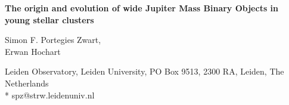 \documentclass[submission,phys]{lib/SciPost}
\begin{document}
 

\begin{center}{\Large \textbf{
      The origin and evolution of wide Jupiter Mass Binary Objects in young stellar clusters
    }}
\end{center} 

\begin{center}
  Simon F. Portegies Zwart,\\
  Erwan Hochart
\end{center} 

\begin{center}
Leiden Observatory, Leiden University, PO Box 9513, 2300 RA, Leiden, The Netherlands\\
* spz@strw.leidenuniv.nl
\end{center}

\end{document}
